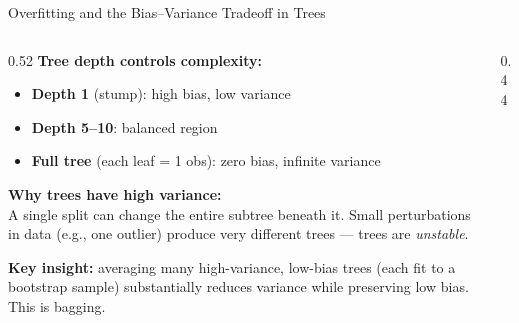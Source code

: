 \documentclass[aspectratio=169, 10pt]{beamer}
\begin{document}
\begin{frame}{Overfitting and the Bias--Variance Tradeoff in Trees}
  \begin{columns}[T]
    \begin{column}{0.52\textwidth}
      \textbf{Tree depth controls complexity:}
      \begin{itemize}
        \item \textbf{Depth 1} (stump): high bias, low variance
        \item \textbf{Depth 5--10}: balanced region
        \item \textbf{Full tree} (each leaf = 1 obs): zero bias, infinite variance
      \end{itemize}

      \medskip
      \textbf{Why trees have high variance:}\\
      A single split can change the entire subtree beneath it.
      Small perturbations in data (e.g., one outlier) produce
      very different trees — trees are \emph{unstable}.

      \medskip
      \begin{keybox}
        \textbf{Key insight:} averaging many high-variance, low-bias
        trees (each fit to a bootstrap sample) substantially reduces variance
        while preserving low bias. This is bagging.
      \end{keybox}
    \end{column}
    \begin{column}{0.44\textwidth}
    \end{column}
  \end{columns}
\end{frame}
\end{document}

